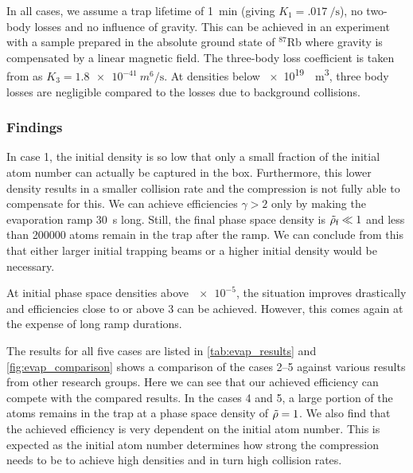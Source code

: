 In all cases, we assume a trap lifetime of \SI{1}{min} (giving $K_1 = \SI{.017}{\per\second}$), no two-body losses and no influence of gravity. This can be achieved in an experiment with a sample prepared in the absolute ground state of $^{87}$Rb where gravity is compensated by a linear magnetic field. The three-body loss coefficient is taken from \cite{threebody} as $K_3 = \SI{1.8e-41}{m^6\per\second}$. At densities below \SI{e19}{\per\meter\cubed}, three body losses are negligible compared to the losses due to background collisions.

\subsubsection*{Findings}
In case 1, the initial density is so low that only a small fraction of the initial atom number can actually be captured in the box. Furthermore, this lower density results in a smaller collision rate and the compression is not fully able to compensate for this. We can achieve efficiencies $\gamma > 2$ only by making the evaporation ramp \SI{30}{s} long. Still, the final phase space density is $\tilde{\rho}_\text{f}\ll 1$ and less than \num{200000} atoms remain in the trap after the ramp. We can conclude from this that either larger initial trapping beams or a higher initial density would be necessary.

At initial phase space densities above $\num{e-5}$, the situation improves drastically and efficiencies close to or above 3 can be achieved. However, this comes again at the expense of long ramp durations.

The results for all five cases are listed in \cref{tab:evap_results} and \cref{fig:evap_comparison} shows a comparison of the cases 2--5 against various results from other research groups. Here we can see that our achieved efficiency can compete with the compared results. In the cases 4 and 5, a large portion of the atoms remains in the trap at a phase space density of $\tilde{\rho} = 1$. We also find that the achieved efficiency is very dependent on the initial atom number. This is expected as the initial atom number determines how strong the compression needs to be to achieve high densities and in turn high collision rates.

